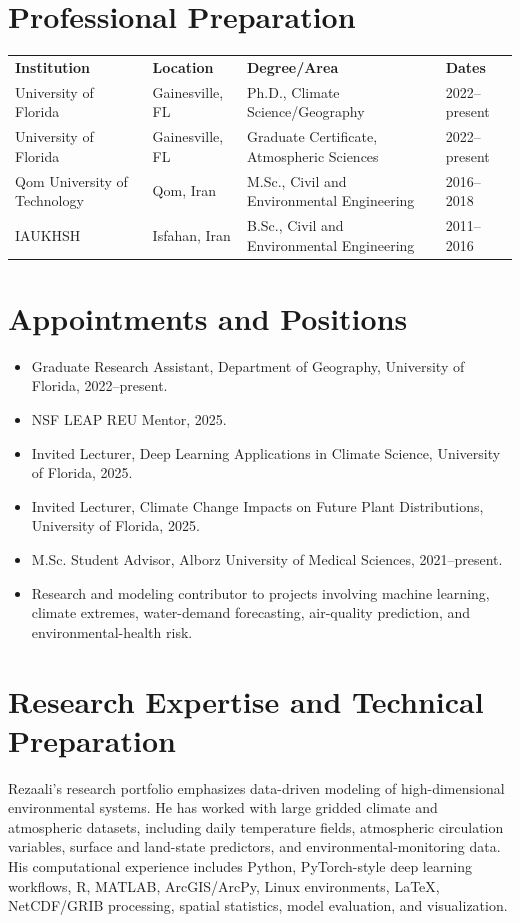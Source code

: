 \documentclass[11pt,letterpaper]{article}
\begin{document}
\section*{Professional Preparation}
\begin{tabular}{p{}p{}p{}p{}}
\textbf{Institution} & \textbf{Location} & \textbf{Degree/Area} & \textbf{Dates}\\
University of Florida & Gainesville, FL & Ph.D., Climate Science/Geography & 2022--present\\
University of Florida & Gainesville, FL & Graduate Certificate, Atmospheric Sciences & 2022--present\\
Qom University of Technology & Qom, Iran & M.Sc., Civil and Environmental Engineering & 2016--2018\\
IAUKHSH & Isfahan, Iran & B.Sc., Civil and Environmental Engineering & 2011--2016\\
\end{tabular}

\section*{Appointments and Positions}
\begin{itemize}
\item Graduate Research Assistant, Department of Geography, University of Florida, 2022--present.
\item NSF LEAP REU Mentor, 2025.
\item Invited Lecturer, Deep Learning Applications in Climate Science, University of Florida, 2025.
\item Invited Lecturer, Climate Change Impacts on Future Plant Distributions, University of Florida, 2025.
\item M.Sc. Student Advisor, Alborz University of Medical Sciences, 2021--present.
\item Research and modeling contributor to projects involving machine learning, climate extremes, water-demand forecasting, air-quality prediction, and environmental-health risk.
\end{itemize}

\section*{Research Expertise and Technical Preparation}
Rezaali's research portfolio emphasizes data-driven modeling of high-dimensional environmental systems. He has worked with large gridded climate and atmospheric datasets, including daily temperature fields, atmospheric circulation variables, surface and land-state predictors, and environmental-monitoring data. His computational experience includes Python, PyTorch-style deep learning workflows, R, MATLAB, ArcGIS/ArcPy, Linux environments, \LaTeX, NetCDF/GRIB processing, spatial statistics, model evaluation, and visualization.
\end{document}
